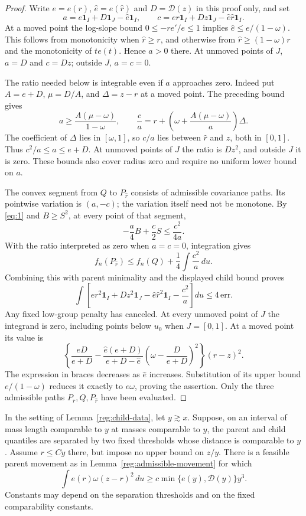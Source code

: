 \begin{proof}
Write $e=e(r)$, $\widehat e=e(\widehat r)$ and
$D=\mathcal D(z)$ in this proof only, and set
\[
 a=e\mathbf1_I+D\mathbf1_J-\widehat e\mathbf1_I,
 \qquad
 c=er\mathbf1_I+Dz\mathbf1_J-\widehat e\widehat r\mathbf1_I.
\]
At a moved point the log-slope bound $0\le-re'/e\le1$ implies
$\widehat e\le e/(1-\omega)$.  This follows from monotonicity
when $\widehat r\ge r$, and otherwise from
$\widehat r\ge(1-\omega)r$ and the monotonicity of $te(t)$.
Hence $a>0$ there.  At unmoved points of $J$, $a=D$ and $c=Dz$;
outside $J$, $a=c=0$.

The ratio needed below is integrable even if $a$ approaches zero.
Indeed put $A=e+D$, $\mu=D/A$, and $\Delta=z-r$ at a moved point.
The preceding bound gives
\[
 a\ge\frac{A(\mu-\omega)}{1-\omega},\qquad
 \frac ca=r+\left(\omega+\frac{A(\mu-\omega)}a\right)\Delta.
\]
The coefficient of $\Delta$ lies in $[\omega,1]$, so $c/a$ lies
between $\widehat r$ and $z$, both in $[0,1]$.  Thus
$c^2/a\le a\le e+D$.  At unmoved points of $J$ the ratio is
$Dz^2$, and outside $J$ it is zero.  These bounds also cover radius
zero and require no uniform lower bound on $a$.

The convex segment from $Q$ to $P_{\widehat r}$ consists of
admissible covariance paths.  Its pointwise variation is $(a,-c)$;
the variation itself need not be monotone.  By \eqref{eq:1} and
$B\ge S^2$, at every point of that segment,
\[
 -\frac a4B+\frac c2S\le\frac{c^2}{4a}.
\]
With the ratio interpreted as zero when $a=c=0$, integration gives
\[
 f_n(P_{\widehat r})\le f_n(Q)+\frac14\int\frac{c^2}a\,du.
\]
Combining this with parent minimality and the displayed child bound
proves
\[
 \int\left[er^2\mathbf1_I+Dz^2\mathbf1_J
       -\widehat e\widehat r^2\mathbf1_I-\frac{c^2}a\right]du
       \le4\,\mathrm{err}.
\]
Any fixed low-group penalty has canceled.  At every unmoved point
of $J$ the integrand is zero, including points below $u_0$ when
$J=[0,1]$.  At a moved point its value is
\[
 \left\{\frac{eD}{e+D}
  -\frac{\widehat e(e+D)}{e+D-\widehat e}
       \left(\omega-\frac D{e+D}\right)^2\right\}(r-z)^2.
\]
The expression in braces decreases as $\widehat e$ increases.
Substitution of its upper bound $e/(1-\omega)$ reduces it exactly
to $e\omega$, proving the assertion.  Only the three admissible
paths $P_r,Q,P_{\widehat r}$ have been evaluated.
\end{proof}

\begin{lemma}\label{reg:barriers}
In the setting of Lemma~\ref{reg:child-data}, let $y\gtrsim x$.
Suppose, on an interval of mass length comparable to $y$ at masses
comparable to $y$, the parent and child quantiles are separated by
two fixed thresholds whose distance is comparable to $y$.
Assume $r\le Cy$ there, but impose no upper bound on $z/y$.
There is a feasible parent movement as in
Lemma~\ref{reg:admissible-movement} for which
\[
 \int e(r)\omega(z-r)^2\,du
       \ge c\min\{e(y),\mathcal D(y)\}y^3.
\]
Constants may depend on the separation thresholds and on the
fixed comparability constants.
\end{lemma}

